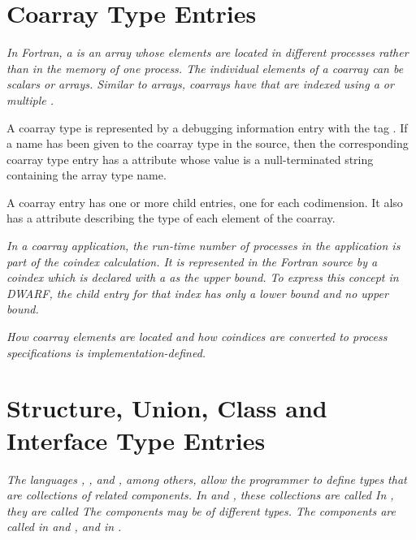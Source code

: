 \section{Coarray Type Entries}
\label{chap:coarraytypeentries}
\textit{In Fortran, a  is an array whose
elements are located in different processes rather than in the
memory of one process. The individual elements
of a coarray can be scalars or arrays.
Similar to arrays, coarrays have  that are 
indexed using a  or multiple .
}

A coarray type is represented by a debugging information entry 
with the tag \DWTAGcoarraytypeTARG.
If a name has been given to the 
coarray type in the source, then the corresponding coarray type 
entry has a \DWATname{} attribute whose value is a null-terminated 
string containing the array type name.
\bbeb

A coarray entry has one or more \DWTAGsubrangetype{} child entries,
one for each codimension. It also has a \DWATtype{} attribute 
describing the type of each element of the coarray.

\textit{In a coarray application, the run-time number of processes in the application
is part of the coindex calculation.  It is represented in the Fortran source by
a coindex which is declared with a \doublequote{*} as the upper bound.  To express this
concept in DWARF, the \DWTAGsubrangetype{} child entry for that index has 
only a lower bound and no upper bound.}

\textit{How coarray elements are located and how coindices are 
converted to process specifications is implementation-defined.}

\section{Structure, Union, Class and Interface Type Entries}
\label{chap:structureunionclassandinterfacetypeentries}

\textit{The languages 
, 
, and 
, among others, allow the
programmer to define types that are collections of related
components. 
In  and , these collections are called
In , they are called 
The components may be of different types. The components are
called  in  and 
, and  in .}

